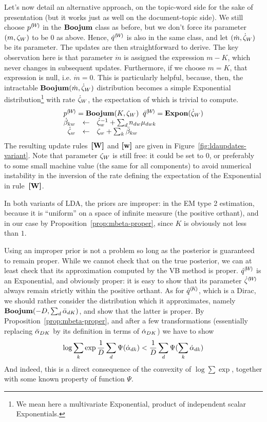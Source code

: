 Let's now detail an alternative approach, on the topic-word side for the sake of presentation (but it works just as well on the document-topic side). We still choose ${p}^{(\!{W}\!)}$ in the $\mathbf{Boojum}$ class as before, but we don't force its parameter $(m,\zeta_W)$ to be $0$ as above. Hence, ${\dot{q}}^{(\!{W}\!)}$ is also in the same class, and let $(\dot{m},\dot{\zeta}_W)$ be its parameter. The updates are then straightforward to derive. The key observation here is that parameter $\dot{m}$ is assigned the expression $m-K$, which never changes in subsequent updates. Furthermore, if we choose $m=K$, that expression is null, i.e. $\dot{m}=0$. This is particularly helpful, because, then, the intractable $\mathbf{Boojum}(\dot{m},\dot{\zeta}_W)$ distribution becomes a simple Exponential distribution\footnote{We mean here a multivariate Exponential, product of independent scalar Exponentials.} with rate $\dot{\zeta}_W$, the expectation of which is trivial to compute.
\[
\begin{array}{rcl}
\multicolumn{3}{c}{
\cpnt{p}{W} = \mbeta(K,\pmW_W)
\;\;
\cpnt{\dot{q}}{W} = \textbf{Expon}(\vvmW_W)
} \\
\vvmKW_{kw} & \assignn & \vvmW_w^{-1}+\sum_dn_{dw}\vvmDWK_{dwk} \\
\vvmW_w & \assignn & \pmW_w+\sum_k\vvmbKW_{kw}
\end{array}
\]
The resulting update rules~$\textbf{[W]}$ and  $\textbf{[w]}$ are given in Figure~\ref{fig:ldaupdates-variant}. Note that parameter $\zeta_W$ is still free: it could be set to $0$, or preferably to some small machine value (the same for all components) to avoid numerical instability in the inversion of the rate defining the expectation of the Exponential in rule~$\textbf{[W]}$.

In both variants of LDA, the priors are improper: in the EM type 2 estimation, because it is ``uniform'' on a space of infinite measure (the positive orthant), and in our case by Proposition~\ref{prop:mbeta-proper}, since $K$ is obviously not less than $1$.

Using an improper prior is not a problem so long as the posterior is guaranteed to remain proper. While we cannot check that on the true posterior, we can at least check that its approximation computed by the VB method is proper. ${\dot{q}}^{(\!{W}\!)}$ is an Exponential, and obviously proper: it is easy to show that its parameter ${\dot{\zeta}}^{(\!{W}\!)}$ always remain strictly within the positive orthant. As for ${\dot{q}}^{(\!{K}\!)}$, which is a Dirac, we should rather consider the distribution which it approximates, namely $\mathbf{Boojum}(-D,\sum_d\bar{\alpha}_{dK})$, and show that the latter is proper. By Proposition~\ref{prop:mbeta-proper}, and after a few transformations (essentially replacing $\bar{\alpha}_{DK}$ by its definition in terms of $\dot{\alpha}_{DK}$) we have to show
\[
\log\sum_k\exp\frac{1}{D}\sum_d\Psi(\dot{\alpha}_{dk})<\frac{1}{D}\sum_{d}\Psi(\sum_k\dot{\alpha}_{dk})
\]
And indeed, this is a direct consequence of the convexity of $\log\sum\exp$, together with some known property of function $\Psi$.

